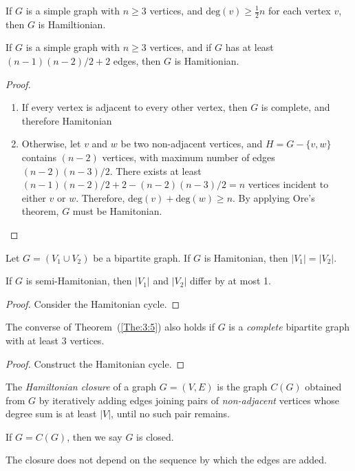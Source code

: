 \begin{corollary}
If $G$ is a simple graph with $n\ge 3$ vertices, and $\text{deg}(v)\ge\frac{1}{2}n$ for each vertex $v$, then $G$ is Hamiltionian.
\end{corollary}

\begin{theorem}
If $G$ is a simple graph with $n\ge 3$ vertices, and if $G$ has at least $(n-1)(n-2)/2+2$ edges, then $G$ is Hamitionian.
\end{theorem}
\begin{proof}
\begin{enumerate}
\item
If every vertex is adjacent to every other vertex, then $G$ is complete, and therefore Hamitonian
\item
Otherwise, let $v$ and $w$ be two non-adjacent vertices, and $H=G-\{v,w\}$ contains $(n-2)$ vertices, with maximum number of edges $(n-2)(n-3)/2$.
There exists at least $(n-1)(n-2)/2+2 - (n-2)(n-3)/2=n$ vertices incident to either $v$ or $w$. Therefore, $\text{deg}(v)+\text{deg}(w)\ge n$. By applying Ore's theorem, $G$ must be Hamitonian. 
\end{enumerate}
\end{proof}


\begin{theorem}\label{The:3:5}
Let $G=(V_1\cup V_2)$ be a bipartite graph.
If $G$ is Hamitonian, then $|V_1|=|V_2|$.

If $G$ is semi-Hamitonian, then $|V_1|$ and $|V_2|$ differ by at most 1.
\end{theorem}
\begin{proof}
Consider the Hamitonian cycle.
\end{proof}

\begin{corollary}
The converse of Theorem~(\ref{The:3:5}) also holds if $G$ is a \emph{complete} bipartite graph with at least 3 vertices.
\end{corollary}
\begin{proof}
Construct the Hamitonian cycle.
\end{proof}

\begin{definition}
The \emph{Hamiltonian closure} of a graph $G=(V,E)$ is the graph $C(G)$ obtained from $G$ by iteratively adding edges joining pairs of \emph{non-adjacent} vertices whose degree sum is at least $|V|$, until no such pair remains.

If $G=C(G)$, then we say $G$ is closed.
\end{definition}
The closure does not depend on the sequence by which the edges are added.

